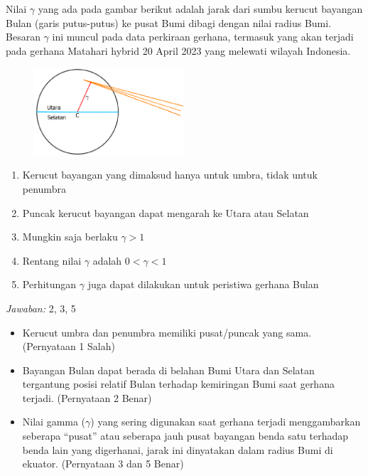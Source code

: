 \documentclass[11pt,fleqn]{exam}
\begin{document}
\begin{questions}
\vspace{0.5cm}
\question Nilai $\gamma$ yang ada pada gambar berikut adalah jarak dari sumbu kerucut bayangan Bulan (garis putus-putus) ke pusat Bumi dibagi dengan nilai radius Bumi. Besaran $\gamma$ ini muncul pada data perkiraan gerhana, termasuk yang akan terjadi pada gerhana Matahari hybrid 20 April 2023 yang melewati wilayah Indonesia.
\begin{figure}[H]
\centering
\includegraphics[width=0.5\textwidth]{osp2022_18.png}
\label{fig:osp2022_18}
\end{figure}
\begin{enumerate}
\item Kerucut bayangan yang dimaksud hanya untuk umbra, tidak untuk penumbra
\item Puncak kerucut bayangan dapat mengarah ke Utara atau Selatan
\item Mungkin saja berlaku $\gamma > 1$
\item Rentang nilai $\gamma$ adalah $0 < \gamma < 1$
\item Perhitungan $\gamma$ juga dapat dilakukan untuk peristiwa gerhana Bulan
\end{enumerate}

\bigskip
\textit{Jawaban: } 2, 3, 5

\begin{itemize}
    \item Kerucut umbra dan penumbra memiliki pusat/puncak yang sama. (Pernyataan 1 Salah)
    \item Bayangan Bulan dapat berada di belahan Bumi Utara dan Selatan tergantung posisi relatif Bulan terhadap kemiringan Bumi saat gerhana terjadi. (Pernyataan 2 Benar)
    \item Nilai gamma ($\gamma$) yang sering digunakan saat gerhana terjadi menggambarkan seberapa ``pusat'' atau seberapa jauh pusat bayangan benda satu terhadap benda lain yang digerhanai, jarak ini dinyatakan dalam radius Bumi di ekuator. (Pernyataan 3 dan 5 Benar)
\end{itemize}


\end{questions}
\end{document}
